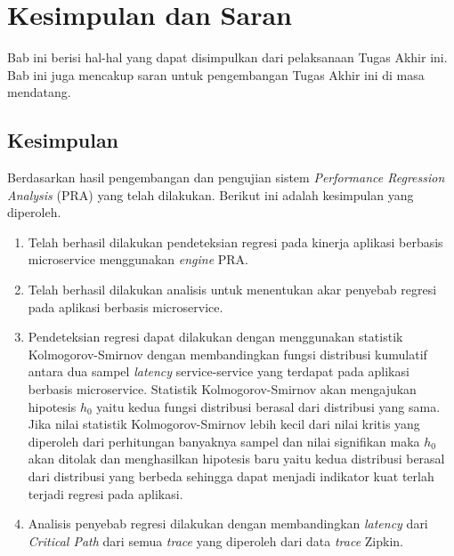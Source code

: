 \chapter{Kesimpulan dan Saran}
Bab ini berisi hal-hal yang dapat disimpulkan dari pelaksanaan Tugas Akhir ini. Bab ini juga mencakup saran untuk pengembangan Tugas Akhir ini di masa mendatang.

\section{Kesimpulan}
Berdasarkan hasil pengembangan dan pengujian sistem \textit{Performance Regression Analysis} (PRA) yang telah dilakukan. Berikut ini adalah kesimpulan yang diperoleh.
\begin{enumerate}
	\item Telah berhasil dilakukan pendeteksian regresi pada kinerja aplikasi berbasis microservice menggunakan \textit{engine} PRA.
	\item Telah berhasil dilakukan analisis untuk menentukan akar penyebab regresi pada aplikasi berbasis microservice.
	\item Pendeteksian regresi dapat dilakukan dengan menggunakan statistik Kolmogorov-Smirnov dengan membandingkan fungsi distribusi kumulatif antara dua sampel \textit{latency} service-service yang terdapat pada aplikasi berbasis microservice. Statistik Kolmogorov-Smirnov akan mengajukan hipotesis $h_{0}$ yaitu kedua fungsi distribusi berasal dari distribusi yang sama. Jika nilai statistik Kolmogorov-Smirnov lebih kecil dari nilai kritis yang diperoleh dari perhitungan banyaknya sampel dan nilai signifikan maka $h_{0}$ akan ditolak dan menghasilkan hipotesis baru yaitu kedua distribusi berasal dari distribusi yang berbeda sehingga dapat menjadi indikator kuat terlah terjadi regresi pada aplikasi.
	\item Analisis penyebab regresi dilakukan dengan membandingkan \textit{latency} dari \textit{Critical Path} dari semua \textit{trace} yang diperoleh dari data \textit{trace} Zipkin. 
	

\end{enumerate}
